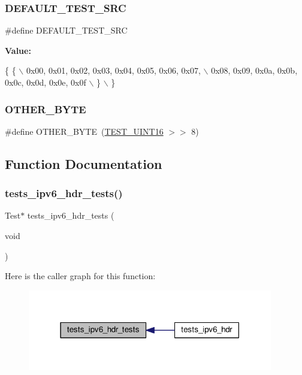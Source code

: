 \subsubsection{\texorpdfstring{D\+E\+F\+A\+U\+L\+T\+\_\+\+T\+E\+S\+T\+\_\+\+S\+RC}{DEFAULT\_TEST\_SRC}}
{\footnotesize\ttfamily \#define D\+E\+F\+A\+U\+L\+T\+\_\+\+T\+E\+S\+T\+\_\+\+S\+RC}

{\bfseries Value\+:}
\begin{DoxyCode}
\{ \{ \(\backslash\)
            0x00, 0x01, 0x02, 0x03, 0x04, 0x05, 0x06, 0x07, \(\backslash\)
            0x08, 0x09, 0x0a, 0x0b, 0x0c, 0x0d, 0x0e, 0x0f \(\backslash\)
        \} \(\backslash\)
    \}
\end{DoxyCode}
\mbox{\label{tests-ipv6__hdr_8c_aeb431b9770aa6eb0d3993bed4b5ede02}} 
\subsubsection{\texorpdfstring{O\+T\+H\+E\+R\+\_\+\+B\+Y\+TE}{OTHER\_BYTE}}
{\footnotesize\ttfamily \#define O\+T\+H\+E\+R\+\_\+\+B\+Y\+TE~(\hyperlink{unittests-constants_8h_ada84310dd4f52d94096d5baed5eb75e1}{T\+E\+S\+T\+\_\+\+U\+I\+N\+T16} $>$$>$ 8)}



\subsection{Function Documentation}
\mbox{\label{tests-ipv6__hdr_8c_a0004de43e2620b11aa446d616e0724e9}} 
\subsubsection{\texorpdfstring{tests\+\_\+ipv6\+\_\+hdr\+\_\+tests()}{tests\_ipv6\_hdr\_tests()}}
{\footnotesize\ttfamily Test$\ast$ tests\+\_\+ipv6\+\_\+hdr\+\_\+tests (\begin{DoxyParamCaption}\item[{void}]{ }\end{DoxyParamCaption})}

Here is the caller graph for this function\+:
\nopagebreak
\begin{figure}[H]
\begin{center}
\leavevmode
\includegraphics[width=303pt]{tests-ipv6__hdr_8c_a0004de43e2620b11aa446d616e0724e9_icgraph}
\end{center}
\end{figure}
